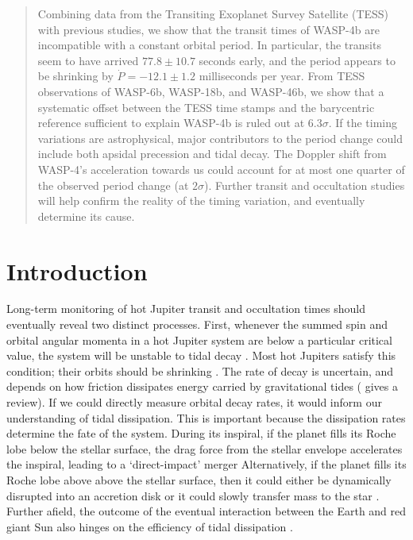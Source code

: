 \documentclass[12pt,twocolumn,tighten]{aastex62}
\begin{document}
\begin{abstract}
  Combining data from the Transiting Exoplanet Survey Satellite (TESS)
  with previous studies, we show that the transit times of WASP-4b are
  incompatible with a constant orbital period. 
  In particular, the transits seem to have arrived $77.8 \pm 10.7$
  seconds early, and the period appears to be shrinking by
  $\dot{P}=-12.1 \pm 1.2$ milliseconds per year.   
  From TESS observations of WASP-6b, WASP-18b, and WASP-46b, we show
  that a systematic offset between the TESS time stamps and the barycentric
  reference sufficient to explain WASP-4b is ruled out at 6.3$\sigma$.
  If the timing variations are astrophysical,
  major contributors to the period change could include both
  apsidal precession and tidal decay.
  The Doppler shift from WASP-4's acceleration towards us could
  account for at most one quarter of the observed period change
  (at $2\sigma$).
  Further transit and occultation studies will help confirm the
  reality of the timing variation, and eventually determine its cause.
\end{abstract}


\section{Introduction}
\label{sec:intro}

Long-term monitoring of hot Jupiter transit and occultation times should
eventually reveal two distinct processes.  First, whenever the summed
spin and orbital angular momenta in a hot Jupiter system are below a
particular critical value, the system will be unstable to tidal decay
\citep{counselman_outcomes_1973,hut_stability_1980}.  Most hot Jupiters
satisfy this condition; their orbits should be shrinking
\citep{levrard_falling_2009,matsumura_tidal_2010}.  The rate of decay is
uncertain, and depends on how friction dissipates energy carried by
gravitational tides (\citealt{ogilvie_tidal_2014} gives a review).  If
we could directly measure orbital decay rates, it would inform our
understanding of tidal dissipation.  This is important because the
dissipation rates determine the fate of the system.  During its
inspiral, if the planet fills its Roche lobe below the stellar surface,
the drag force from the stellar envelope accelerates the inspiral,
leading to a `direct-impact' merger
\citep{metzger_optical_2012,macleod_planetary_2018} Alternatively, if
the planet fills its Roche lobe above above the stellar surface, then it
could either be dynamically disrupted into an accretion disk or it could
slowly transfer mass to the star
\citep{metzger_optical_2012,valsecchi_tidally-driven_2015,jackson_tidal_2016}.
Further afield, the outcome of the eventual interaction between the
Earth and red giant Sun also hinges on the efficiency of tidal
dissipation \citep{rasio_tidal_1996}.
\end{document}
